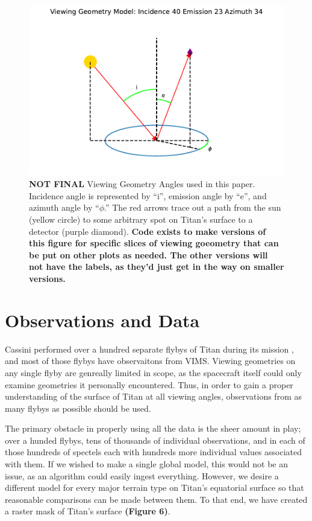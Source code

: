 \documentclass[twocolumn,linenumbers]{aastex631}
\begin{document}
\begin{figure}[htbp]
\includegraphics[scale = 0.55]{VGDisplayLabel.pdf}
\centering
\caption{\textbf{\color{red} NOT FINAL \color{black}} Viewing Geometry Angles used in this paper. Incidence angle is represented by ``i'', emission angle by ``e'', and azimuth angle by ``$\phi$.'' The red arrows trace out a path from the sun (yellow circle) to some arbitrary spot on Titan's surface to a detector (purple diamond). \textbf{\color{red} Code exists to make versions of this figure for specific slices of viewing goeometry that can be put on other plots as needed. The other versions will not have the labels, as they'd just get in the way on smaller versions.\color{black}}}
\label{fig:5}
\end{figure}

\section{Observations and Data} \label{sec:observe}

Cassini performed over a hundred separate flybys of Titan during its mission \citep{Seal2017}, and most of those flybys have observaitons from VIMS. Viewing geometries on any single flyby are genreally limited in scope, as the spacecraft itself could only examine geometries it personally encountered. Thus, in order to gain a proper understanding of the surface of Titan at all viewing angles, observations from as many flybys as possible should be used. 

The primary obstacle in properly using all the data is the sheer amount in play; over a hunded flybys, tens of thousands of individual observations, and in each of those hundreds of spectels each with hundreds more individual values associated with them. If we wished to make a single global model, this would not be an issue, as an algorithm could easily ingest everything. However, we desire a different model for every major terrain type on Titan's equatorial surface so that reasonable comparisons can be made between them. To that end, we have created a raster mask of Titan's surface \textbf{\color{blue}(Figure 6)\color{black}}.
\end{document}

